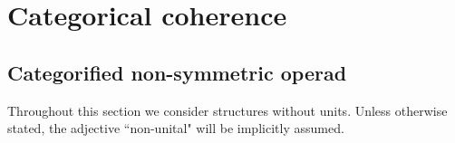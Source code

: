
\section{Categorical coherence} 
\label{s:catoperads}

 
\subsection{Categorified non-symmetric operad}
\label{ss:def-catoperads}

Throughout this section we consider structures without units.
Unless otherwise stated, the adjective ``non-unital" will be implicitly assumed. 

